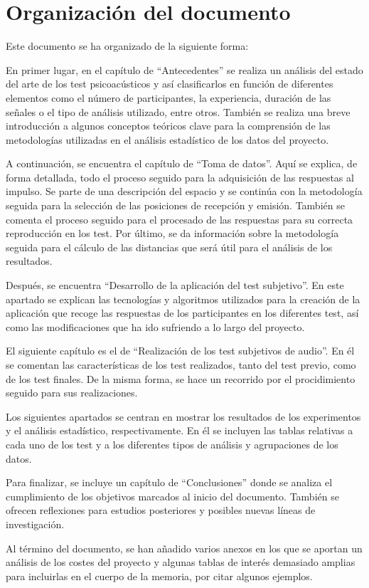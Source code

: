 \documentclass[11pt,a4paper,twoside]{book}
\begin{document}
    \section{Organización del documento}
        Este documento se ha organizado de la siguiente forma:
        
        En primer lugar, en el capítulo de ``Antecedentes'' se realiza un análisis del estado del arte de los test psicoacústicos y así clasificarlos en función de diferentes elementos como el número de participantes, la experiencia, duración de las señales o el tipo de análisis utilizado, entre otros. También se realiza una breve introducción a algunos conceptos teóricos clave para la comprensión de las metodologías utilizadas en el análisis estadístico de los datos del proyecto.
        
        A continuación, se encuentra el capítulo de ``Toma de datos''. Aquí se explica, de forma detallada, todo el proceso seguido para la adquisición de las respuestas al impulso. Se parte de una descripción del espacio y se continúa con la metodología seguida para la selección de las posiciones de recepción y emisión. También se comenta el proceso seguido para el procesado de las respuestas para su correcta reproducción en los test. Por último, se da información sobre la metodología seguida para el cálculo de las distancias que será útil para el análisis de los resultados.
        
        Después, se encuentra ``Desarrollo de la aplicación del test subjetivo''. En este apartado se explican las tecnologías y algoritmos utilizados para la creación de la aplicación que recoge las respuestas de los participantes en los diferentes test, así como las modificaciones que ha ido sufriendo a lo largo del proyecto.
        
        El siguiente capítulo es el de ``Realización de los test subjetivos de audio''. En él se comentan las características de los test realizados, tanto del test previo, como de los test finales. De la misma forma, se hace un recorrido por el procidimiento seguido para sus realizaciones.
        
        Los siguientes apartados se centran en mostrar los resultados de los experimentos y el análisis estadístico, respectivamente. En él se incluyen las tablas relativas a cada uno de los test y a los diferentes tipos de análisis y agrupaciones de los datos.
        
        Para finalizar, se incluye un capítulo de ``Conclusiones'' donde se analiza el cumplimiento de los objetivos marcados al inicio del documento. También se ofrecen reflexiones para estudios posteriores y posibles nuevas líneas de investigación.
        
        Al término del documento, se han añadido varios anexos en los que se aportan un análisis de los costes del proyecto y algunas tablas de interés demasiado amplias para incluirlas en el cuerpo de la memoria, por citar algunos ejemplos.
    
\end{document}
